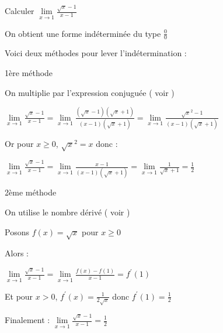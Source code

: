
%
Calculer $\lim\limits_{x\rightarrow 1}\frac{\sqrt{x}-1}{x-1}$
\begin{corrige}
     On obtient une forme indéterminée du type \og$\frac{0}{0}$\fg{}
     \par
     Voici deux méthodes pour lever l'indétermination :
     \begin{h3}1ère méthode\end{h3}
     On multiplie par l'expression conjuguée ( voir  )
     \par
     $\lim\limits_{x\rightarrow 1}\frac{\sqrt{x}-1}{x-1}=\lim\limits_{x\rightarrow 1}\frac{\left(\sqrt{x}-1\right)\left(\sqrt{x}+1\right)}{\left(x-1\right)\left(\sqrt{x}+1\right)}=\lim\limits_{x\rightarrow 1}\frac{\sqrt{x}^{2}-1}{\left(x-1\right)\left(\sqrt{x}+1\right)}$
     \par
     Or pour $x\geqslant 0$, $\sqrt{x}^{2}=x$ donc :
     \par
     $\lim\limits_{x\rightarrow 1}\frac{\sqrt{x}-1}{x-1}=\lim\limits_{x\rightarrow 1}\frac{x-1}{\left(x-1\right)\left(\sqrt{x}+1\right)}=\lim\limits_{x\rightarrow 1}\frac{1}{\sqrt{x}+1}=\frac{1}{2}$
     \begin{h3}2ème méthode\end{h3}
     On utilise le nombre dérivé ( voir  )
     \par
     Posons $f\left(x\right)=\sqrt{x}$ pour $x\geqslant 0$
     \par
     Alors :
     \par
     $\lim\limits_{x\rightarrow 1}\frac{\sqrt{x}-1}{x-1}=\lim\limits_{x\rightarrow 1}\frac{f\left(x\right)-f\left(1\right)}{x-1}=f^{\prime}\left(1\right)$
     \par
     Et pour $x > 0$, $f^{\prime}\left(x\right)=\frac{1}{2\sqrt{x}}$ donc $f^{\prime}\left(1\right)=\frac{1}{2}$
     \par
     Finalement : $\lim\limits_{x\rightarrow 1}\frac{\sqrt{x}-1}{x-1}=\frac{1}{2}$
\end{corrige}
